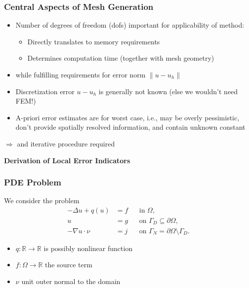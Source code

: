\documentclass[aspectratio=169,11pt]{beamer}
\theoremstyle{definition}
\begin{document}
\begin{frame}
\frametitle{Central Aspects of Mesh Generation}
\begin{itemize}
  \item Number of degrees of freedom (dofs) important for applicability of method:
    \begin{itemize}
      \item Directly translates to memory requirements
      \item Determines computation time (together with mesh geometry)
    \end{itemize}
  \item {} while fulfilling requirements for
    error norm $\| u - u_h \|$
  \item Discretization error $u - u_h$ is generally not known (else we wouldn't need
    FEM!)
  \item A-priori error estimates are for worst case, i.e., may be overly pessimistic,
    don't provide spatially resolved information, and contain unknown constant
\end{itemize}
$\Rightarrow$  and iterative procedure required
\end{frame}

\begin{frame}
\begin{center}
\Large\textbf{Derivation of Local Error Indicators}
\end{center}
\end{frame}


\begin{frame}
\frametitle{PDE Problem}
We consider the problem
\begin{subequations}\label{eq:ProblemStrong}
\begin{align*}
-\Delta u + q(u) &= f &&\text{in $\Omega$},\\
u &= g &&\text{on $\Gamma_D\subseteq\partial\Omega$},\\
-\nabla u\cdot \nu &= j &&\text{on $\Gamma_N=\partial\Omega\setminus\Gamma_D$}.
\end{align*}
\end{subequations}
\begin{itemize}
\item $q:\mathbb{R}\to\mathbb{R}$ is possibly
nonlinear function
\item $f: \Omega\to\mathbb{R}$ the source term
\item $\nu$ unit outer normal to the domain
\end{itemize}
\end{frame}
\end{document}
